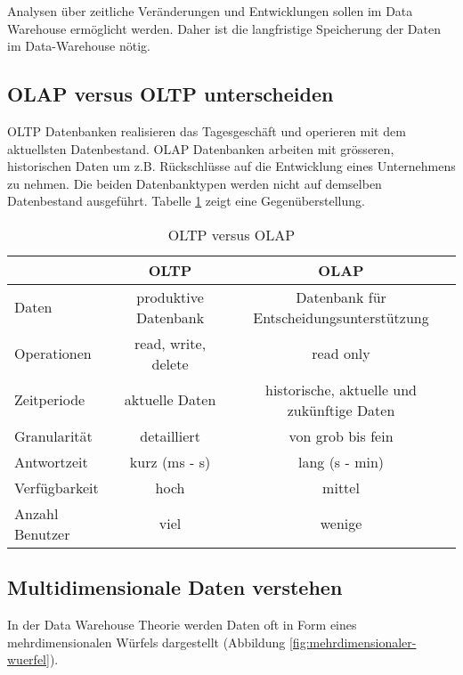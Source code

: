Analysen über zeitliche Veränderungen und Entwicklungen sollen im Data Warehouse ermöglicht werden. Daher ist die langfristige Speicherung der Daten im Data-Warehouse nötig.

\subsection{OLAP versus OLTP unterscheiden}

\ac{OLTP} Datenbanken realisieren das Tagesgeschäft und operieren mit dem aktuellsten Datenbestand. \ac{OLAP} Datenbanken arbeiten mit grösseren, historischen Daten um z.B. Rückschlüsse auf die Entwicklung eines Unternehmens zu nehmen. Die beiden Datenbanktypen werden nicht auf demselben Datenbestand ausgeführt. Tabelle \ref{tab:oltp-olap} zeigt eine Gegenüberstellung.

\begin{table}[h!]
	\centering
	\begin{tabular}{|l|c|c|}
		\hline  				& \ac{OLTP} 			& \ac{OLAP} 									\\ 
		\hline Daten 			& produktive Datenbank 	& Datenbank für Entscheidungsunterstützung 		\\ 
		\hline Operationen		& read, write, delete  	& read only 									\\
		\hline Zeitperiode 		& aktuelle Daten 		& historische, aktuelle und zukünftige Daten 	\\ 
		\hline Granularität 	& detailliert 			& von grob bis fein 							\\ 
		\hline Antwortzeit 		& kurz (ms - s) 		& lang (s - min) 								\\ 
		\hline Verfügbarkeit 	& hoch 					& mittel 										\\ 
		\hline Anzahl Benutzer 	& viel 					& wenige 										\\ 
		\hline 
	\end{tabular}
	\caption{OLTP versus OLAP}
	\label{tab:oltp-olap}
\end{table}

\subsection{Multidimensionale Daten verstehen}

In der Data Warehouse Theorie werden Daten oft in Form eines mehrdimensionalen Würfels dargestellt (Abbildung \ref{fig:mehrdimensionaler-wuerfel}).


